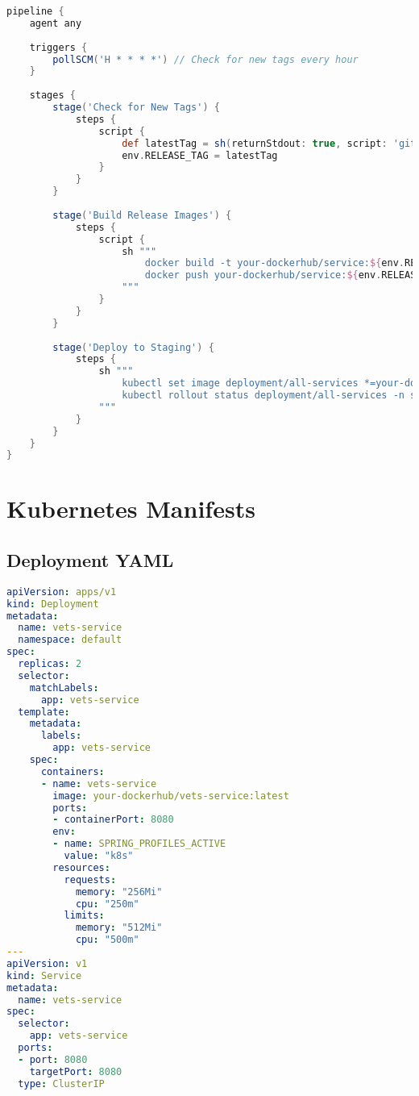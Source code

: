 \documentclass[12pt,a4paper]{article}
\begin{document}
\begin{lstlisting}[language=groovy, caption=Pipeline staging với release tags]
pipeline {
    agent any
    
    triggers {
        pollSCM('H * * * *') // Check for new tags every hour
    }
    
    stages {
        stage('Check for New Tags') {
            steps {
                script {
                    def latestTag = sh(returnStdout: true, script: 'git describe --tags --abbrev=0').trim()
                    env.RELEASE_TAG = latestTag
                }
            }
        }
        
        stage('Build Release Images') {
            steps {
                script {
                    sh """
                        docker build -t your-dockerhub/service:${env.RELEASE_TAG} .
                        docker push your-dockerhub/service:${env.RELEASE_TAG}
                    """
                }
            }
        }
        
        stage('Deploy to Staging') {
            steps {
                sh """
                    kubectl set image deployment/all-services *=your-dockerhub/*:${env.RELEASE_TAG} -n staging
                    kubectl rollout status deployment/all-services -n staging
                """
            }
        }
    }
}
\end{lstlisting}

\section{Kubernetes Manifests}

\subsection{Deployment YAML}
\begin{lstlisting}[language=yaml, caption=Example deployment manifest]
apiVersion: apps/v1
kind: Deployment
metadata:
  name: vets-service
  namespace: default
spec:
  replicas: 2
  selector:
    matchLabels:
      app: vets-service
  template:
    metadata:
      labels:
        app: vets-service
    spec:
      containers:
      - name: vets-service
        image: your-dockerhub/vets-service:latest
        ports:
        - containerPort: 8080
        env:
        - name: SPRING_PROFILES_ACTIVE
          value: "k8s"
        resources:
          requests:
            memory: "256Mi"
            cpu: "250m"
          limits:
            memory: "512Mi"
            cpu: "500m"
---
apiVersion: v1
kind: Service
metadata:
  name: vets-service
spec:
  selector:
    app: vets-service
  ports:
  - port: 8080
    targetPort: 8080
  type: ClusterIP
\end{lstlisting}
\end{document}
